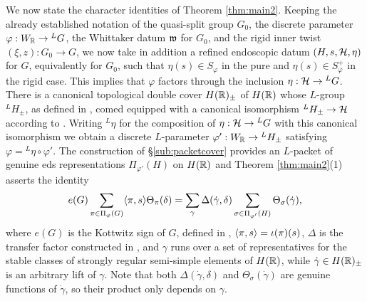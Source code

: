 \documentclass{article}
\theoremstyle{definition}
\numberwithin{equation}{section}
\renewcommand{\-}{\hyp{}}
\begin{document}
We now state the character identities of Theorem \ref{thm:main2}. Keeping the already established notation of the quasi-split group $G_0$, the discrete parameter $\varphi : W_{\mathbb{R}} \to {^LG}$, the Whittaker datum $\mathfrak{w}$ for $G_0$, and the rigid inner twist $(\xi,z) : G_0 \to G$, we now take in addition a refined endoscopic datum $(H,s,\mathcal{H},\eta)$ for $G$, equivalently for $G_0$, such that $\eta(s) \in S_\varphi$ in the pure and $\eta(s) \in S_\varphi^+$ in the rigid case. This implies that $\varphi$ factors through the inclusion $\eta : \mathcal{H} \to {^LG}$. There is a canonical topological double cover $H(\mathbb{R})_\pm$ of $H(\mathbb{R})$ whose $L$-group $^LH_\pm$, as defined in \cite[\S2.6]{KalHDC}, comed equipped with a canonical isomorphism $^LH_\pm \to \mathcal{H}$ according to \cite[\S3.1]{KalHDC}. Writing $^L\eta$ for the composition of $\eta : \mathcal{H} \to {^LG}$ with this canonical isomorphism we obtain a discrete $L$-parameter $\varphi' : W_{\mathbb{R}} \to {^LH_\pm}$ satisfying $\varphi = {^L\eta}\circ\varphi'$. The construction of \S\ref{sub:packetcover} provides an $L$-packet of genuine eds representations $\Pi_{\varphi'}(H)$ on $H(\mathbb{R})$ and Theorem \ref{thm:main2}(1) asserts the identity
\begin{equation} \label{eq:s4}
	e(G)\sum_{\pi \in \Pi_\varphi(G)}\langle\pi,s\rangle\Theta_\pi(\delta) = \sum_\gamma \Delta(\dot\gamma,\delta)\sum_{\sigma \in \Pi_{\varphi'}(H)} \Theta_{\sigma}(\dot\gamma),
\end{equation}
where $e(G)$ is the Kottwitz sign of $G$, defined in \cite{Kot83}, $\langle\pi,s\rangle=\iota(\pi)(s)$, $\Delta$ is the transfer factor constructed in \cite[\S4.3]{KalHDC}, and $\gamma$ runs over a set of representatives for the stable classes of strongly regular semi-simple elements of $H(\mathbb{R})$, while $\dot \gamma \in H(\mathbb{R})_\pm$ is an arbitrary lift of $\gamma$. Note that both $\Delta(\dot\gamma,\delta)$ and $\Theta_{\sigma}(\dot\gamma)$ are genuine functions of $\dot\gamma$, so their product only depends on $\gamma$.
\end{document}

